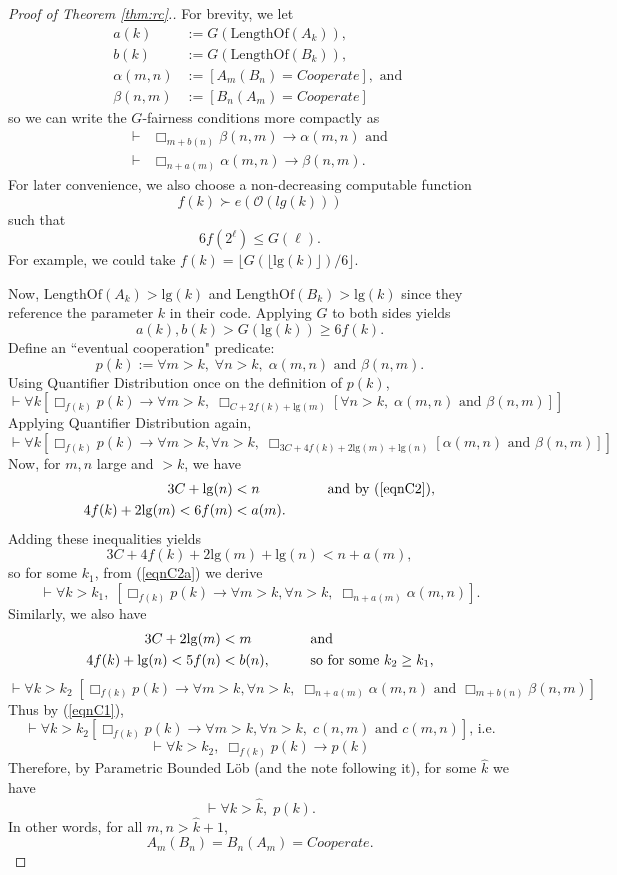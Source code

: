 \documentclass[jsl,reqno,bibay2]{asl}
\newcommand{\ef}{e}
\newcommand{\floor}[1]{\lfloor #1 \rfloor}
\numberwithin{equation}{section}
\newcommand{\eqn}[1]{\begin{equation}#1\end{equation}}
\theoremstyle{definition}
\newcommand{\Oo}{\mathcal{O}}
\newcommand{\proves}[1]{\underset{#1}{\vdash}}
\newcommand{\bx}[1]{\Box_{#1}}
\renewcommand{\implies}{\rightarrow}
\newcommand{\AND}{{\textrm{ and }}}
\renewcommand{\lg}[1]{\mathrm{lg}(#1)}
\renewcommand{\-}{^{-1}}
\begin{document}
\begin{proof}[Proof of Theorem \ref{thm:rc}.]
For brevity, we let
\begin{align}
a(k) &:= G(\mathrm{LengthOf}(A_k)), \\
b(k) &:= G(\mathrm{LengthOf}(B_k)), \\
\alpha(m,n) &:= [A_m(B_n) = Cooperate], \text{ and }\\
\beta(n,m) &:= [B_n(A_m) = Cooperate]
\end{align}
so we can write the $G$-fairness conditions more compactly as
\begin{align}
\label{eqnC1}     \proves{} &\bx{m+b(n)} \beta(n,m) \implies \alpha(m,n) \text{ and}\\
\nonumber    \proves{} &\bx{n+a(m)} \alpha(m,n) \implies \beta(n,m).
\end{align}
%
\noindent For later convenience, we also choose a non-decreasing computable function 
$$f(k) \succ \ef(\Oo(lg(k)))$$ 
such that 
$$6f(2^\ell) \leq G(\ell).$$
For example, we could take $f(k) = \floor{G(\floor{\lg{k}})/6}$. 

Now, $\mathrm{LengthOf}(A_k) > \lg{k}$ and $\mathrm{LengthOf}(B_k) > \lg{k}$ since they reference the parameter $k$ in their code.  Applying $G$ to both sides yields
\eqn{\label{eqnC2} a(k),b(k) > G(\lg{k}) \geq 6f(k).}
Define an ``eventual cooperation" predicate:
$$p(k) := \forall m> k,\; \forall n> k, \; \alpha(m,n) \AND \beta(n,m).$$
Using Quantifier Distribution once on the definition of $p(k)$,
$$\proves{} \forall k [\bx{f(k)}p(k) \implies \forall m>k, \; \bx{C+2f(k)+\lg{m} } [\forall n > k, \; \alpha(m,n) \AND \beta(n,m)]]$$
Applying Quantifier Distribution again,
\eqn{\label{eqnC2a}\proves{} \forall k [\bx{f(k)}p(k) \implies \forall m>k, \forall n > k, \;  \bx{3C+4f(k)+2\lg{m} +\lg{n} }[\alpha(m,n) \AND \beta(n,m)]]}
Now, for $m,n$ large and $>k$, we have
\begin{align*}
3C + \lg{n}  &< n &&\textrm{ \quad and by (\ref{eqnC2}),}\\
4f(k) + 2\lg{m}  < 6f(m) &< a(m). &&
\end{align*}
Adding these inequalities yields
$$3C+4f(k)+2\lg{m} +\lg{n} < n+a(m),$$
so for some $k_1$, from (\ref{eqnC2a}) we derive
$$\proves{} \forall k>k_1,\; [\bx{f(k)}p(k) \implies \forall m>k, \forall n > k, \;  \bx{n+a(m)}\alpha(m,n)].$$
Similarly, we also have
\begin{align*}
3C + 2\lg{m}  &< m &&\textrm{ \quad and }\\
4f(k) + \lg{n}  < 5f(n) &< b(n), &&\text{ \quad so for some $k_2\geq k_1$,}
\end{align*}
$$\proves{} \forall k>k_2 \; [\bx{f(k)}p(k) \implies \forall m>k, \forall n > k, \;  \bx{n+a(m)}\alpha(m,n) \AND \bx{m+b(n)}\beta(n,m)]$$
Thus by (\ref{eqnC1}),
$$\proves{} \forall k > k_2 [\bx{f(k)}p(k) \implies \forall m>k, \forall n > k, \;  c(n,m) \AND c(m,n)]\text{, i.e.}$$
$$\proves{} \forall k > k_2, \; \bx{f(k)}p(k) \implies p(k)$$
Therefore, by Parametric Bounded L\"{o}b (and the note following it), for some $\hat k$ we have
$$\proves{} \forall k > \hat k, \; p(k).$$
In other words, for all $m,n>\hat k + 1$, 
$$A_m(B_n)=B_n(A_m)=Cooperate.$$
\end{proof}
\end{document}
